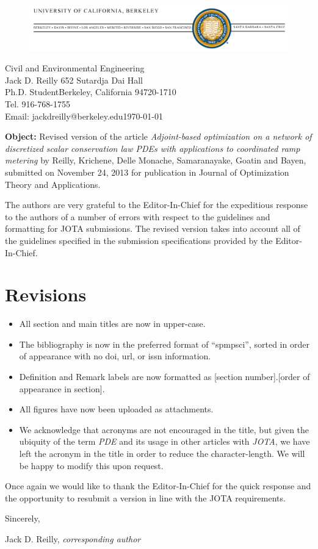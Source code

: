 \documentclass[10pt]{article}
\begin{document}
%
\begin{figure}
\includegraphics[width=1\columnwidth]{berkeley-letterhead.jpg}
\end{figure}



\hfill{}Civil and Environmental Engineering \\
Jack D. Reilly \hfill{}652 Sutardja Dai Hall \\
Ph.D. Student\hfill{}\hfill{}Berkeley, California 94720-1710\\
Tel. 916-768-1755 \\
Email: jackdreilly@berkeley.edu\hfill{}\today

\bigskip{}


\bigskip{}
\textbf{Object:} Revised version of the article \textit{Adjoint-based optimization on a network of discretized scalar conservation law PDEs with applications to coordinated ramp metering}
 by Reilly, Krichene, Delle Monache, Samaranayake, Goatin and Bayen, submitted on November 24, 2013 for publication in Journal of Optimization Theory and Applications.

\bigskip{}


\bigskip{}


The authors are very grateful to the Editor-In-Chief for the expeditious response to the authors of a number of errors with respect to the guidelines and formatting for JOTA submissions. The revised version takes into account all of the guidelines specified in the submission specifications provided by the Editor-In-Chief.\\

\section{Revisions}

\begin{itemize}
	\item All section and main titles are now in upper-case.
	\item The bibliography is now in the preferred format of ``spmpsci'', sorted in order of appearance with no doi, url, or issn information.
	\item Definition and Remark labels are now formatted as [section number].[order of appearance in section].
	\item All figures have now been uploaded as attachments.
	\item We acknowledge that acronyms are not encouraged in the title, but given the ubiquity of the term \emph{PDE} and its usage in other articles with \emph{JOTA}, we have left the acronym in the title in order to reduce the character-length. We will be happy to modify this upon request.
\end{itemize}


\bigskip{}


Once again we would like to thank the Editor-In-Chief for the quick response and the opportunity to resubmit a version in line with the JOTA requirements.

Sincerely,
\bigskip{}

\hfill Jack D. Reilly, \emph{corresponding author}\\


\vfill{}
\end{document}
